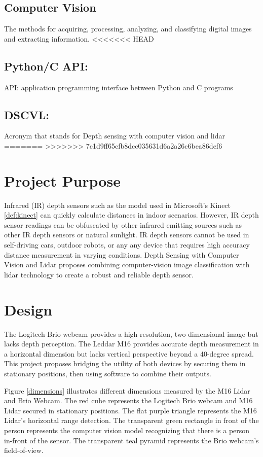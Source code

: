 \documentclass[onecolumn, draftclsnofoot,10pt, compsoc]{IEEEtran}
\begin{document}
\begin{singlespace}
		\subsection{Computer Vision }\label{def:vision}
		The methods for acquiring, processing, analyzing, and classifying digital images and extracting information.
<<<<<<< HEAD
		
			
		\subsection{Python/C API: }\label{def:API}\cite{Ctype}\par
		API: application programming interface between Python and C programs
		
		\subsection{DSCVL: }\label{def:DSCVL}
		Acronym that stands for Depth sensing with computer vision and lidar
=======
>>>>>>> 7c1d9ff65cfb8dcc035631d6a2a26c6bea86def6

		
	\section{Project Purpose}
		Infrared (IR) depth sensors such as the model used in Microsoft's Kinect \ref{def:kinect} can quickly calculate distances in indoor scenarios.
		However, IR depth sensor readings can be obfuscated by other infrared emitting sources such as other IR depth sensors or natural sunlight.
		IR depth sensors cannot be used in self-driving cars, outdoor robots, or any any device that requires high accuracy distance measurement in varying conditions.
		Depth Sensing with Computer Vision and Lidar proposes combining computer-vision image classification with lidar technology to create a robust and reliable depth sensor.

	\section{Design}
		The Logitech Brio webcam provides a high-resolution, two-dimensional image but lacks depth perception.
		The Leddar M16 provides accurate depth measurement in a horizontal dimension but lacks vertical perspective beyond a 40-degree spread.
		This project proposes bridging the utility of both devices by securing them in stationary positions, then using software to combine their outputs.		


		Figure \ref{dimensions} illustrates different dimensions measured by the M16 Lidar and Brio Webcam.
		The red cube represents the Logitech Brio webcam and M16 Lidar secured in stationary positions.
		The flat purple triangle represents the M16 Lidar's horizontal range detection.
		The transparent green rectangle in front of the person represents the computer vision model recognizing that there is a person in-front of the sensor.
		The transparent teal pyramid represents the Brio webcam's field-of-view.
		

\end{singlespace}
\end{document}

